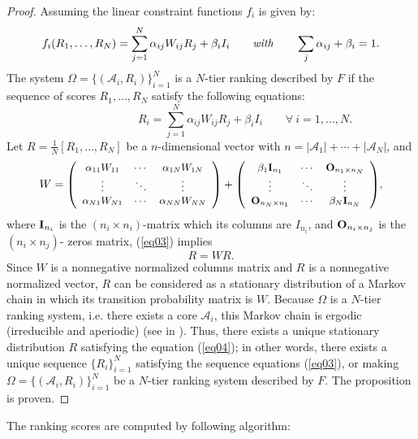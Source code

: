 \documentclass[lnicst]{svmultln}
\begin{document}
\begin{proof}
Assuming the linear constraint functions $f_i$ is given by:
\[f_i(R_1,\ldots,R_N) = \sum^N_{j=1}\alpha_{ij}W_{ij}R_j + \beta_iI_i\qquad \emph{with} \qquad\sum_j\alpha_{ij} + \beta_i = 1.\]
The system $\Omega = \{(\mathcal{A}_i,R_i)\}^N_{i=1}$ is a $N$-tier ranking described by $F$ if the sequence of scores $R_1,\ldots,R_N$ satisfy the following equations:
\begin{equation}\label{eq03}
\qquad\qquad\qquad R_i = \sum^N_{j=1}\alpha_{ij}W_{ij}R_j + \beta_iI_i\qquad\forall~ i = 1,\ldots,N.
\end{equation}
Let $R = \frac{1}{N}[R_1,\ldots,R_N]$ be a $n$-dimensional vector with $n = |\mathcal{A}_1| + \cdots + |\mathcal{A}_N|$, and
\[W = {\footnotesize\left( \begin{array}{ccc}
\alpha_{11}W_{11} & \cdots & \alpha_{1N}W_{1N} \\
\vdots & \ddots & \vdots \\
\alpha_{N1}W_{N1} & \cdots & \alpha_{NN}W_{NN} \end{array} \right) +
\left( \begin{array}{ccc}
\beta_1{\bf I}_{n_1} & \cdots & {\bf O}_{n_1\times n_N} \\
\vdots & \ddots & \vdots \\
{\bf O}_{n_N\times n_1} & \cdots & \beta_N{\bf I}_{n_N} \end{array} \right)},\]
where ${\bf I}_{n_i}$ is the $(n_i\times n_i)$-matrix which its columns are $I_{n_i}$, and ${\bf O}_{n_i\times n_j}$ is the $(n_i\times n_j)$- zeros matrix, (\ref{eq03}) implies
\begin{equation}\label{eq04}
R = WR.
\end{equation}
Since $W$ is a nonnegative normalized columns matrix and $R$ is a nonnegative normalized vector, $R$ can be considered as a stationary distribution of a Markov chain in which its transition probability matrix is $W$. Because $\Omega$ is a $N$-tier ranking system, i.e. there exists a core $\mathcal{A}_i$, this Markov chain is ergodic (irreducible and aperiodic) (see in \cite{Kien09}). Thus, there exists a unique stationary distribution $R$ satisfying the equation (\ref{eq04}); in other words, there exists a unique sequence $\{R_i\}^N_{i=1}$ satisfying the sequence equations (\ref{eq03}), or making $\Omega = \{(\mathcal{A}_i,R_i)\}^N_{i=1}$ be a $N$-tier ranking system described by $F$. The proposition is proven.
\end{proof}
The ranking scores are computed by following algorithm:\\
\end{document}

